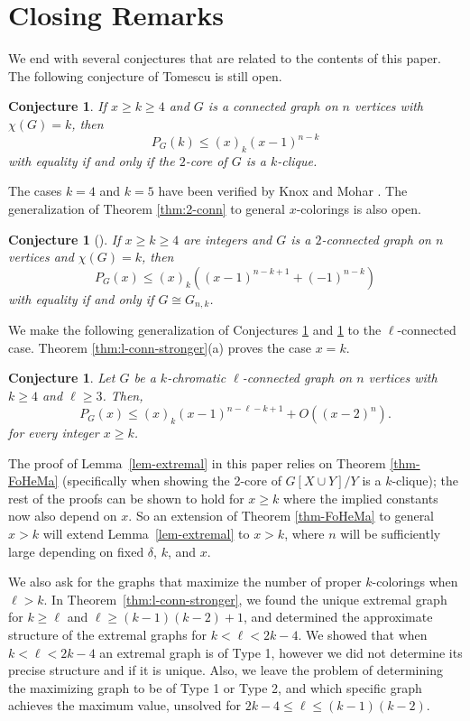 \documentclass[11pt]{article}
\theoremstyle{plain}
\newtheorem{conjecture}[theorem]{Conjecture}
\theoremstyle{definition}
\theoremstyle{remark}
\begin{document}
\section{Closing Remarks}

We end with several conjectures that are related to the contents of this paper. The following conjecture of Tomescu is still open.

\begin{conjecture} \label{conj:tomescu-general}
If $x\ge k\ge 4$ and $G$ is a connected graph on $n$ vertices with $\chi(G)=k$, then
\[
P_G(k) \le (x)_k(x-1)^{n-k}
\]
with equality if and only if the $2$-core of $G$ is a $k$-clique.
\end{conjecture}
The cases $k=4$ and $k=5$ have been verified by Knox and Mohar \cite{KnMo1, KnMo2}.  The generalization of Theorem \ref{thm:2-conn} to general $x$-colorings is also open.

\begin{conjecture}[\cite{BrownErey}]\label{conj:tomescu-2conn}
If $x\ge k\ge 4$ are integers and $G$ is a $2$-connected graph on $n$ vertices and $\chi(G)=k$, then
\[
P_G(x)\leq (x)_k((x-1)^{n-k+1}+(-1)^{n-k})
\]
with equality if and only if $G\cong G_{n,k}$.
\end{conjecture}

We make the following generalization of Conjectures \ref{conj:tomescu-general} and \ref{conj:tomescu-2conn} to the $\ell$-connected case.  Theorem \ref{thm:l-conn-stronger}(a) proves the case $x=k$.

\begin{conjecture}
Let $G$ be a $k$-chromatic $\ell$-connected graph on $n$ vertices with $k\geq 4$ and $\ell \geq 3$.
 Then, 
\[P_G(x)\leq (x)_k(x-1)^{n-\ell -k +1}+O((x-2)^n).\]
for every integer $x\geq k$.
\end{conjecture}

The proof of Lemma~\ref{lem-extremal} in this paper relies on Theorem \ref{thm-FoHeMa} (specifically when showing the 2-core of $G[X\cup Y]/Y$ is a $k$-clique); the rest of the proofs can be shown to hold for $x \geq k$ where the implied constants now also depend on $x$. So an extension of Theorem \ref{thm-FoHeMa} to general $x>k$ will extend Lemma~\ref{lem-extremal} to $x>k$, where $n$ will be sufficiently large depending on fixed $\delta$, $k$, and $x$.  


We also ask for the graphs that maximize the number of proper $k$-colorings when $\ell >k$. In Theorem~\ref{thm:l-conn-stronger}, we found the unique extremal graph for $k\geq \ell$ and $\ell\geq (k-1)(k-2)+1$, and determined the approximate structure of the extremal graphs for $k<\ell < 2k-4$.  We showed that when $k<\ell <2k-4$ an extremal graph is of Type 1, however we did not determine its precise structure and if it is unique. Also, we leave the problem of determining the maximizing graph to be of Type 1 or Type 2, and which specific graph achieves the maximum value, unsolved for $2k-4\leq \ell \leq  (k-1)(k-2)$. 
\end{document}
